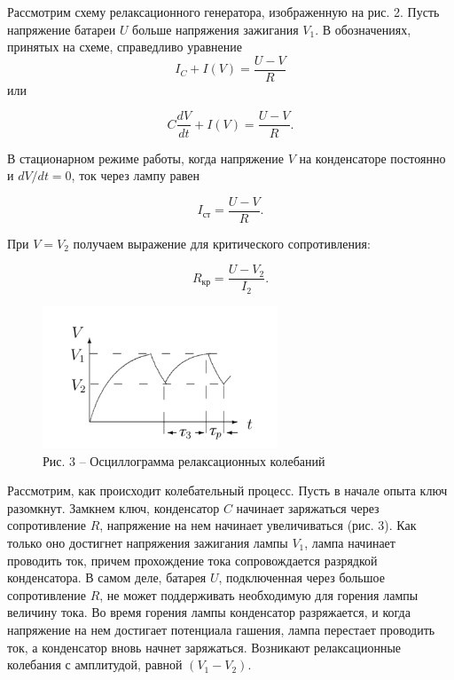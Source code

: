 \documentclass[a4paper,14pt]{article}
\begin{document}
Рассмотрим схему релаксационного генератора, изображенную на рис. 2. Пусть напряжение батареи $U$ больше напряжения зажигания $V_1$. В обозначениях, принятых на схеме, справедливо уравнение $$I_C + I(V) = \dfrac{U-V}{R}$$ или 

\begin{equation}
C\dfrac{dV}{dt} + I(V) = \dfrac{U-V}{R}.
\label{eq1}
\end{equation}

В стационарном режиме работы, когда напряжение $V$ на конденсаторе постоянно и $dV/dt = 0$, ток через лампу равен 

\begin{equation}
I_{\text{ст}} = \dfrac{U-V}{R}.
\label{eq2}
\end{equation}

При $V = V_2$ получаем выражение для критического сопротивления:

\begin{equation}
R_{\text{кр}} = \dfrac{U-V_2}{I_2}.
\label{eq3}
\end{equation}

\begin{figure}[!h]
	\centering
	\includegraphics[width = 7cm]{3} \\
	Рис. 3 -- Осциллограмма релаксационных колебаний
\end{figure}

Рассмотрим, как происходит колебательный процесс. Пусть в начале опыта ключ разомкнут. Замкнем ключ, конденсатор $C$ начинает заряжаться через сопротивление $R$, напряжение на нем начинает увеличиваться (рис. 3). Как только оно достигнет напряжения зажигания лампы $V_1$, лампа начинает проводить ток, причем прохождение тока сопровождается разрядкой конденсатора. В самом деле, батарея $U$, подключенная через большое сопротивление $R$, не может поддерживать необходимую для горения лампы величину тока. Во время горения лампы конденсатор разряжается, и когда напряжение на нем достигает потенциала гашения, лампа перестает проводить ток, а конденсатор вновь начнет заряжаться. Возникают релаксационные колебания с амплитудой, равной $(V_1-V_2)$.
\end{document}
